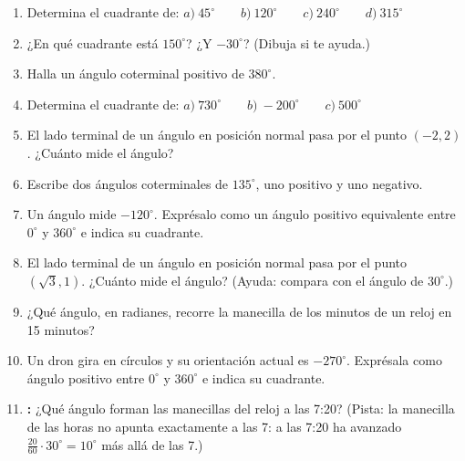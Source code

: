 \documentclass[12pt, letterpaper]{article}
\begin{document}
\begin{enumerate}[leftmargin=*, resume]
  \item \facil{} Determina el cuadrante de: $a)\ 45^{\circ} \qquad b)\ 120^{\circ} \qquad c)\ 240^{\circ} \qquad d)\ 315^{\circ}$

  \item \facil{} ¿En qué cuadrante está $150^{\circ}$? ¿Y $-30^{\circ}$? (Dibuja si te ayuda.)

  \item \facil{} Halla un ángulo coterminal positivo de $380^{\circ}$.

  \item \medio{} Determina el cuadrante de: $a)\ 730^{\circ} \qquad b)\ -200^{\circ} \qquad c)\ 500^{\circ}$

  \item \medio{} El lado terminal de un ángulo en posición normal pasa por el punto $(-2, 2)$. ¿Cuánto mide el ángulo?

  \item \medio{} Escribe dos ángulos coterminales de $135^{\circ}$, uno positivo y uno negativo.

  \item \medio{} Un ángulo mide $-120^{\circ}$. Exprésalo como un ángulo positivo equivalente entre $0^{\circ}$ y $360^{\circ}$ e indica su cuadrante.

  \item \dificil{} El lado terminal de un ángulo en posición normal pasa por el punto $(\sqrt{3}, 1)$. ¿Cuánto mide el ángulo? (Ayuda: compara con el ángulo de $30^{\circ}$.)

  \item \dificil{} ¿Qué ángulo, en radianes, recorre la manecilla de los minutos de un reloj en 15 minutos?

  \item \dificil{} Un dron gira en círculos y su orientación actual es $-270^{\circ}$. Exprésala como ángulo positivo entre $0^{\circ}$ y $360^{\circ}$ e indica su cuadrante.

  \item \dificil{} \textbf{:} ¿Qué ángulo forman las manecillas del reloj a las 7:20? (Pista: la manecilla de las horas no apunta exactamente a las 7: a las 7:20 ha avanzado $\frac{20}{60} \cdot 30^{\circ} = 10^{\circ}$ más allá de las 7.)
\end{enumerate}

\newpage

\ifmwclaves
\end{document}
